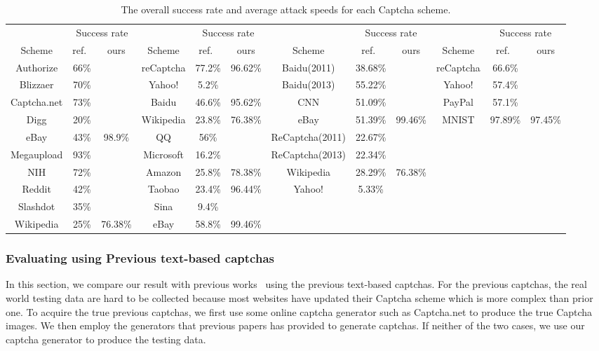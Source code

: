 \begin{table}[t]
    \centering
    \caption{The overall success rate and average attack speeds for each Captcha scheme.}
    \label{table: overall_rate}
    \scriptsize
    \begin{tabular}{|c|c|c|c|c|c|c|c|c|c|c|c|}
        \hline
        & \multicolumn{2}{|c|}{Success rate}& & \multicolumn{2}{|c|}{Success rate} & &\multicolumn{2}{|c|}{Success rate} & & \multicolumn{2}{|c|}{Success rate}\\
        \cline{2-3} \cline{5-6} \cline{8-9} \cline{11-12}
        \multirow{-2}{*}{Scheme} & ref.~\cite{Bursztein2011Text} & ours & \multirow{-2}{*}{Scheme} & ref.~\cite{Gao2016A} & ours & \multirow{-2}{*}{Scheme} & ref.~\cite{Bursztein2014The} & ours & \multirow{-2}{*}{Scheme} & ref.~\cite{George2017A} & ours \\
        \hline
        Authorize & 66\% & & reCaptcha & 77.2\% & 96.62\% & Baidu(2011) & 38.68\% & & reCaptcha & 66.6\% & \\
        \hline
        Blizzaer & 70\% & & Yahoo! & 5.2\% & & Baidu(2013) & 55.22\% & & Yahoo! & 57.4\% & \\
        \hline
        Captcha.net & 73\% & & Baidu & 46.6\% & 95.62\% & CNN & 51.09\% & & PayPal & 57.1\% & \\
        \hline
        Digg & 20\% & & Wikipedia & 23.8\% & 76.38\% & eBay & 51.39\% & 99.46\% & MNIST & 97.89\% & 97.45\% \\
        \hline
        eBay & 43\% & 98.9\% & QQ & 56\% & & ReCaptcha(2011) & 22.67\% & & & &\\
        \hline
        Megaupload & 93\% & & Microsoft & 16.2\% & & ReCaptcha(2013) & 22.34\% & & & & \\
        \hline
        NIH & 72\% & & Amazon & 25.8\% & 78.38\% & Wikipedia & 28.29\% & 76.38\% & & & \\
        \hline
        Reddit & 42\% & & Taobao & 23.4\% & 96.44\% & Yahoo! & 5.33\% & & & &  \\
        \hline
        Slashdot & 35\% & & Sina & 9.4\% & & & & & & & \\
        \hline
        Wikipedia & 25\% & 76.38\% & eBay & 58.8\% & 99.46\% & & & & & & \\
        \hline
    \end{tabular}
\end{table}

\subsubsection{Evaluating using Previous text-based captchas}
In this section, we compare our result with previous works~\cite{Bursztein2011Text,Gao2016A,Bursztein2014The} using the previous text-based captchas.
For the previous captchas, the real world testing data are hard to be collected because most websites have updated their Captcha scheme which is more complex than prior one. To acquire the true previous captchas, we first use some online captcha generator such as Captcha.net to produce the true Captcha images. We then employ the generators that previous papers has provided to generate captchas. If neither of the two cases, we use our captcha generator to produce the testing data.

